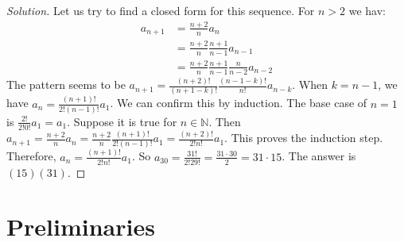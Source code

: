 \documentclass[crop=false,class=book,oneside]{standalone}                      %
\begin{document}
        \begin{proof}[Solution]
            Let us try to find a closed form for this sequence. For $n>2$ we hav:
            \begin{align*}
                a_{n+1} &= \frac{n+2}{n}a_n \\
                &= \frac{n+2}{n}\frac{n+1}{n-1}a_{n-1}\\
                &= \frac{n+2}{n}\frac{n+1}{n-1}\frac{n}{n-2}a_{n-2}
            \end{align*}
            The pattern seems to be $a_{n+1} = \frac{(n+2)!}{(n+1-k)!}\frac{(n-1-k)!}{n!}a_{n-k}$. When $k=n-1$, we have $a_{n} = \frac{(n+1)!}{2!(n-1)!}a_1$. We can confirm this by induction. The base case of $n=1$ is $\frac{2!}{2!0!}a_1 = a_1$. Suppose it is true for $n\in \mathbb{N}$. Then $a_{n+1} = \frac{n+2}{n} a_n = \frac{n+2}{n} \frac{(n+1)!}{2!(n-1)!}a_1 = \frac{(n+2)!}{2!n!}a_1$. This proves the induction step. Therefore, $a_n = \frac{(n+1)!}{2!n!}a_1$. So $a_{30} = \frac{31!}{2!29!} = \frac{31\cdot 30}{2} = 31\cdot 15$. The answer is $(15)(31)$.
            \end{proof}
    \section{Preliminaries}
\end{document}
